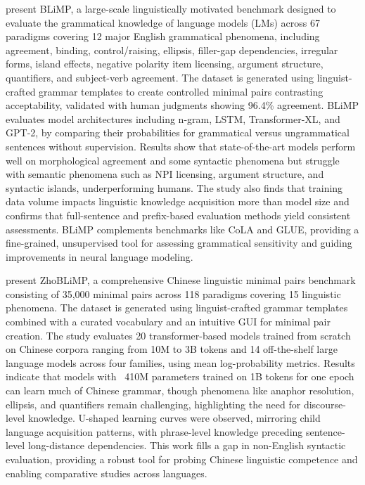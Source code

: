 \documentclass[acmsmall]{acmart}
\begin{document}
\citep{warstadt2023blimpbenchmarklinguisticminimal} present BLiMP, a large-scale linguistically motivated benchmark designed to evaluate the grammatical knowledge of language models (LMs) across 67 paradigms covering 12 major English grammatical phenomena, including agreement, binding, control/raising, ellipsis, filler-gap dependencies, irregular forms, island effects, negative polarity item licensing, argument structure, quantifiers, and subject-verb agreement. The dataset is generated using linguist-crafted grammar templates to create controlled minimal pairs contrasting acceptability, validated with human judgments showing 96.4\% agreement. BLiMP evaluates model architectures including n-gram, LSTM, Transformer-XL, and GPT-2, by comparing their probabilities for grammatical versus ungrammatical sentences without supervision. Results show that state-of-the-art models perform well on morphological agreement and some syntactic phenomena but struggle with semantic phenomena such as NPI licensing, argument structure, and syntactic islands, underperforming humans. The study also finds that training data volume impacts linguistic knowledge acquisition more than model size and confirms that full-sentence and prefix-based evaluation methods yield consistent assessments. BLiMP complements benchmarks like CoLA and GLUE, providing a fine-grained, unsupervised tool for assessing grammatical sensitivity and guiding improvements in neural language modeling.

\citep{liu2024zhoblimpsystematicassessmentlanguage} present ZhoBLiMP, a comprehensive Chinese linguistic minimal pairs benchmark consisting of 35,000 minimal pairs across 118 paradigms covering 15 linguistic phenomena. The dataset is generated using linguist-crafted grammar templates combined with a curated vocabulary and an intuitive GUI for minimal pair creation. The study evaluates 20 transformer-based models trained from scratch on Chinese corpora ranging from 10M to 3B tokens and 14 off-the-shelf large language models across four families, using mean log-probability metrics. Results indicate that models with ~410M parameters trained on 1B tokens for one epoch can learn much of Chinese grammar, though phenomena like anaphor resolution, ellipsis, and quantifiers remain challenging, highlighting the need for discourse-level knowledge. U-shaped learning curves were observed, mirroring child language acquisition patterns, with phrase-level knowledge preceding sentence-level long-distance dependencies. This work fills a gap in non-English syntactic evaluation, providing a robust tool for probing Chinese linguistic competence and enabling comparative studies across languages.
\end{document}
